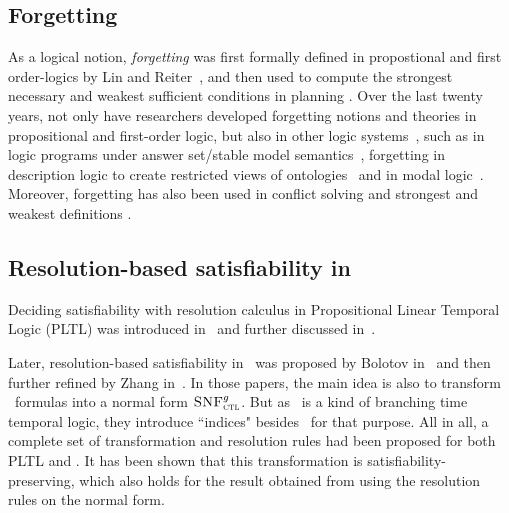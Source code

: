 \documentclass[letterpaper]{article} %
\begin{document}
\subsection{Forgetting}
As a logical notion, \emph{forgetting} was first formally defined
in propostional and first order-logics by Lin and Reiter~\cite{lin1994forget}, and then used to compute the strongest necessary and weakest sufficient conditions in planning \cite{DBLP:journals/ai/Lin01}.
Over the last twenty years, not only have researchers developed forgetting notions and theories in propositional and first-order logic, but also in other logic systems~\cite{eiter2019brief}, 
such as in logic programs under answer set/stable model semantics~\cite{DBLP:Zhang:AIJ2006,Eiter2008Semantic,Wong:PhD:Thesis,Yisong:KR:2012,Yisong:IJCAI:2013}, forgetting in description logic to create restricted views of ontologies~\cite{Wang:AMAI:2010,Lutz:IJCAI:2011,zhao2017role}  and in modal logic~\cite{Yan:AIJ:2009,Kaile:JAIR:2009,Yongmei:IJCAI:2011,fang2019forgetting}. 
Moreover, forgetting has also been used in  conflict solving \cite{Lang2010Reasoning,Zhang2005Solving} and 
strongest and weakest definitions \cite{Lang2008On}.

\subsection{Resolution-based satisfiability  in \CTL}
Deciding satisfiability with resolution calculus in Propositional Linear Temporal Logic (PLTL) was introduced in~\cite{fisher1991resolution} and further discussed in~\cite{fisher1997normal,fisher2001clausal}. 

Later,  resolution-based satisfiability in \CTL\ was proposed by Bolotov in~\cite{bolotov2000clausal}  and then further refined by Zhang in~\cite{zhang2014resolution}.
In those papers, the main idea is also to transform \CTL\ formulas into a normal form ${\textsc{SNF}_{\textsc{ctl}}^g}$.
But as \CTL\ is a kind of branching time temporal logic, they introduce ``indices" besides \start\ for that purpose. All in all, a complete set of transformation and resolution rules had been proposed for both PLTL and \CTL. It has been shown that this transformation is satisfiability-preserving, which also holds for the result obtained from using the resolution rules on the normal form.
\end{document}
